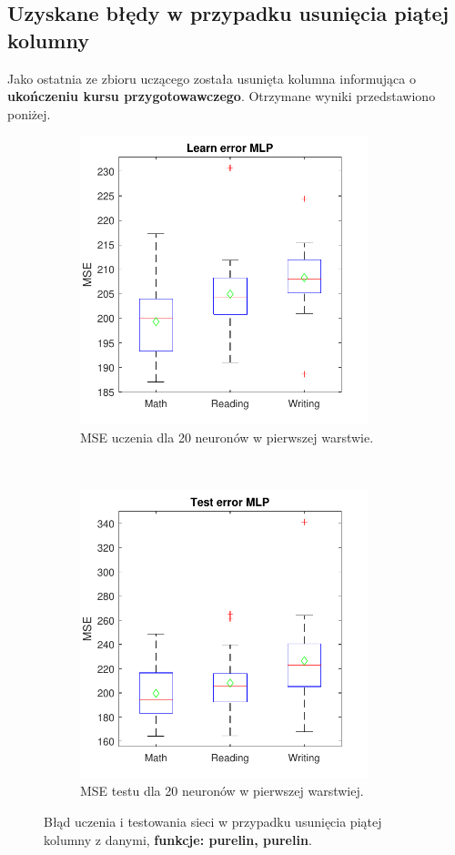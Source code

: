\documentclass[12pt]{article}
\begin{document}
\pagebreak
\subsection{Uzyskane błędy w przypadku usunięcia piątej kolumny}
Jako ostatnia ze zbioru uczącego została usunięta kolumna informująca o \textbf{ukończeniu kursu przygotowawczego}. Otrzymane wyniki przedstawiono poniżej.
\begin{figure}[H]
\centering
\begin{subfigure}[t]{0.48\textwidth} 
\centering
\includegraphics[height=3.3in]{purelin_purelin_20_without_5_learnBoxplot.pdf}
\caption{MSE uczenia dla  20 neuronów w pierwszej warstwie.}
\end{subfigure}
~~
\begin{subfigure}[t]{0.48\textwidth} 
\centering
\includegraphics[height=3.3in]{purelin_purelin_20_without_5_testBoxplot.pdf}
\caption{MSE testu dla  20  neuronów w pierwszej warstwiej.}
\end{subfigure}

\caption{Błąd uczenia i testowania sieci w przypadku usunięcia piątej  kolumny z danymi, \textbf{funkcje: purelin, purelin}.} 
\end{figure}
\end{document}
